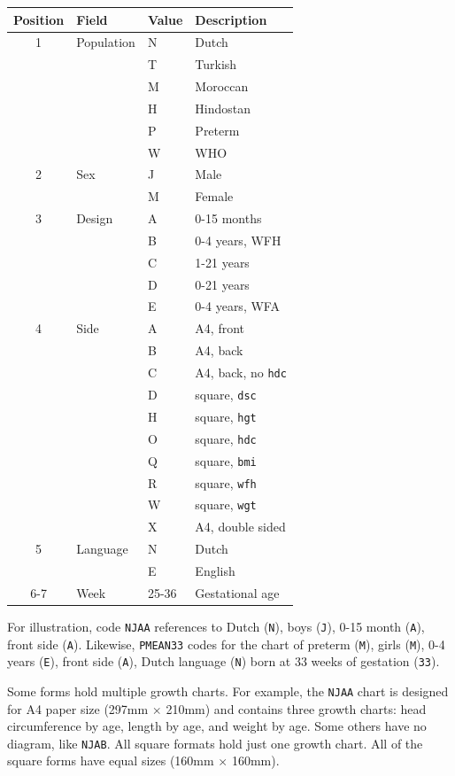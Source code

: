 \documentclass[
]{book}
\begin{document}
\begin{longtable}[]{@{}clll@{}}
\toprule()
Position & Field & Value & Description \\
\midrule()
\endhead
1 & Population & N & Dutch \\
& & T & Turkish \\
& & M & Moroccan \\
& & H & Hindostan \\
& & P & Preterm \\
& & W & WHO \\
2 & Sex & J & Male \\
& & M & Female \\
3 & Design & A & 0-15 months \\
& & B & 0-4 years, WFH \\
& & C & 1-21 years \\
& & D & 0-21 years \\
& & E & 0-4 years, WFA \\
4 & Side & A & A4, front \\
& & B & A4, back \\
& & C & A4, back, no \texttt{hdc} \\
& & D & square, \texttt{dsc} \\
& & H & square, \texttt{hgt} \\
& & O & square, \texttt{hdc} \\
& & Q & square, \texttt{bmi} \\
& & R & square, \texttt{wfh} \\
& & W & square, \texttt{wgt} \\
& & X & A4, double sided \\
5 & Language & N & Dutch \\
& & E & English \\
6-7 & Week & 25-36 & Gestational age \\
\bottomrule()
\end{longtable}

For illustration, code \texttt{NJAA} references to Dutch (\texttt{N}), boys (\texttt{J}), 0-15 month (\texttt{A}), front side (\texttt{A}). Likewise, \texttt{PMEAN33} codes for the chart of preterm (\texttt{M}), girls (\texttt{M}), 0-4 years (\texttt{E}), front side (\texttt{A}), Dutch language (\texttt{N}) born at 33 weeks of gestation (\texttt{33}).

Some forms hold multiple growth charts. For example, the \texttt{NJAA} chart is designed for A4 paper size (297mm \(\times\) 210mm) and contains three growth charts: head circumference by age, length by age, and weight by age. Some others have no diagram, like \texttt{NJAB}. All square formats hold just one growth chart. All of the square forms have equal sizes (160mm \(\times\) 160mm).
\end{document}
